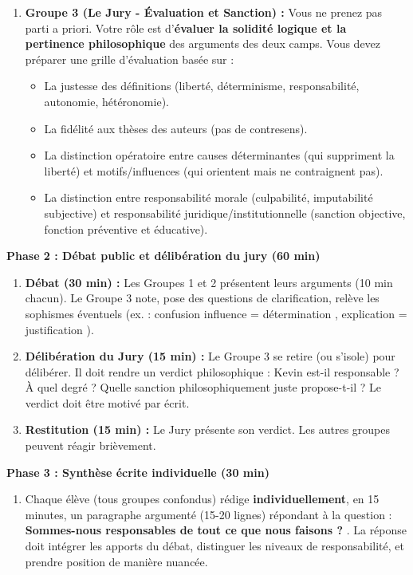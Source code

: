 \documentclass[11pt]{article}
\newcommand{\cle}[1]{{\popxbold\color{popdark}#1}}
\begin{document}
\begin{enumerate}
    \item \textbf{Groupe 3 (Le Jury - Évaluation et Sanction) :} Vous ne prenez pas parti a priori. Votre rôle est d'\textbf{évaluer la solidité logique et la pertinence philosophique} des arguments des deux camps. Vous devez préparer une grille d'évaluation basée sur :
    \begin{itemize}
        \item La justesse des définitions (liberté, déterminisme, responsabilité, autonomie, hétéronomie).
        \item La fidélité aux thèses des auteurs (pas de contresens).
        \item La distinction opératoire entre \cle{causes déterminantes} (qui suppriment la liberté) et \cle{motifs/influences} (qui orientent mais ne contraignent pas).
        \item La distinction entre \cle{responsabilité morale} (culpabilité, imputabilité subjective) et \cle{responsabilité juridique/institutionnelle} (sanction objective, fonction préventive et éducative).
    \end{itemize}
\end{enumerate}

\textbf{Phase 2 : Débat public et délibération du jury (60 min)}\par

\begin{enumerate}
    \item \textbf{Débat (30 min) :} Les Groupes 1 et 2 présentent leurs arguments (10 min chacun). Le Groupe 3 note, pose des questions de clarification, relève les sophismes éventuels (ex. : confusion \guillemotleft influence = détermination \guillemotright, \guillemotleft explication = justification \guillemotright).
    \item \textbf{Délibération du Jury (15 min) :} Le Groupe 3 se retire (ou s'isole) pour délibérer. Il doit rendre un \guillemotleft verdict philosophique \guillemotright : Kevin est-il responsable ? À quel degré ? Quelle sanction \guillemotleft philosophiquement juste \guillemotright propose-t-il ? Le verdict doit être motivé par écrit.
    \item \textbf{Restitution (15 min) :} Le Jury présente son verdict. Les autres groupes peuvent réagir brièvement.
\end{enumerate}

\textbf{Phase 3 : Synthèse écrite individuelle (30 min)}\par

\begin{enumerate}
    \item Chaque élève (tous groupes confondus) rédige \textbf{individuellement}, en 15 minutes, un paragraphe argumenté (15-20 lignes) répondant à la question : \guillemotleft \textbf{Sommes-nous responsables de tout ce que nous faisons ?} \guillemotright. La réponse doit intégrer les apports du débat, distinguer les niveaux de responsabilité, et prendre position de manière nuancée.
\end{enumerate}
\end{document}
